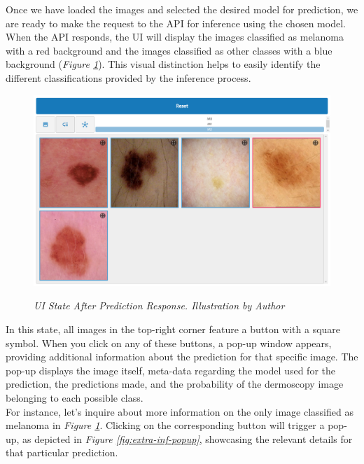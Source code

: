 Once we have loaded the images and selected the desired model for prediction,
we are ready to make the request to the API for inference using the chosen model. When the API responds,
the UI will display the images classified as melanoma with a
red background and the images classified as other classes with a blue background (\textit{Figure \ref{fig:after-prediction}}).
This visual distinction helps to easily identify the different classifications provided by the inference process.

\begin{figure}[H]
\centering
\begin{adjustbox}{width=\textwidth, trim={0cm 3.55cm 0cm 0cm}, clip}
    \includegraphics[width=\textwidth]{imatges/results/after-prediction.png}
\end{adjustbox}
\caption[UI State After Prediction Response]{\textit{UI State After Prediction Response. Illustration by Author}}
{\label{fig:after-prediction}}
\end{figure}

In this state, all images in the top-right corner feature a button with a square symbol.
When you click on any of these buttons, a pop-up window appears, providing additional information about the prediction for that specific image.
The pop-up displays the image itself,
meta-data regarding the model used for the prediction,
the predictions made, and the probability of the dermoscopy image belonging to each possible class. \\

For instance, let's inquire about more information on the only image classified as melanoma in \textit{Figure \ref{fig:after-prediction}}.
Clicking on the corresponding button will trigger a pop-up, as depicted in \textit{Figure \ref{fig:extra-inf-popup}},
showcasing the relevant details for that particular prediction.

